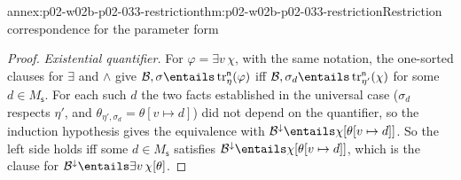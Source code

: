 \begin{annexitem}{annex:p02-w02b-p02-033-restriction}{thm:p02-w02b-p02-033-restriction}{Restriction correspondence for the parameter form}
\begin{proof}
\emph{Existential quantifier.}  For \(\varphi=\exists v\,\chi\), with the same
notation, the one-sorted clauses for \(\exists\) and \(\land\) give
\(\mathcal B,\sigma\entails\operatorname{tr}^{\mathsf n}_{\eta}(\varphi)\) iff
\(\mathcal B,\sigma_d\entails\operatorname{tr}^{\mathsf n}_{\eta'}(\chi)\) for
some \(d\in M_{\mathsf s}\).  For each such \(d\) the two facts established
in the universal case (\(\sigma_d\) respects \(\eta'\), and
\(\theta_{\eta',\sigma_d}=\theta[v\mapsto d]\)) did not depend on the
quantifier, so the induction hypothesis gives the equivalence with
\(\mathcal B^{\downarrow}\entails\chi[\theta[v\mapsto d]]\).  So the left side
holds iff some \(d\in M_{\mathsf s}\) satisfies
\(\mathcal B^{\downarrow}\entails\chi[\theta[v\mapsto d]]\), which is the
clause for \(\mathcal B^{\downarrow}\entails\exists v\,\chi[\theta]\).
\end{proof}
\end{annexitem}


